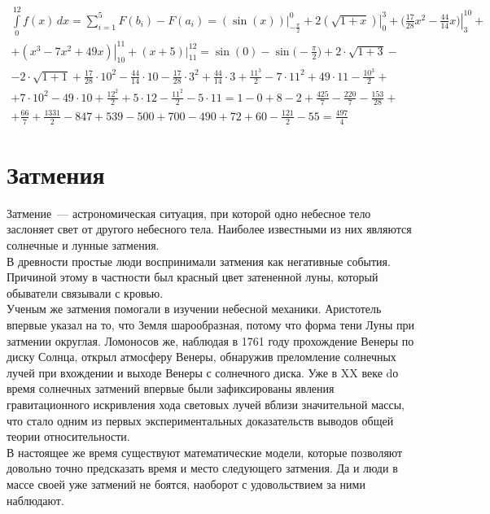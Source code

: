 \documentclass[30pt]{article}
\begin{document}
        \begin{multline}
            \int \limits_{0}^{12} f(x)\,dx = \sum \limits_{i = 1}^{5} F(b_i) - F(a_i) = \left. (\sin(x)) \right|_{-\frac{\pi}{2}}^{0} + 2 \left. (\sqrt{1 + x}) \right|_{0}^{3} + \bigg(\frac{17}{28}x^2 - \left. \frac{44}{14}x\bigg) \right|_{3}^{10} + \\
            + \left. (x^3 - 7x ^ 2 + 49x) \right|_{10}^{11} + \left. (x + 5) \right|_{11}^{12} =  \sin(0) - \sin\bigg(-\frac{\pi}{2}\bigg) + 2 \cdot \sqrt{1 + 3} - \\
            -2 \cdot \sqrt{1 + 1} + \frac{17}{28} \cdot 10^2 - \frac{44}{14} \cdot 10 - \frac{17}{28} \cdot 3^2 + \frac{44}{14} \cdot 3 + \frac{11^3}{2} - 7 \cdot 11^2 + 49 \cdot 11 - \frac{10^3}{2} + \\
            + 7 \cdot 10^2 - 49 \cdot 10 + \frac{12^2}{2} + 5 \cdot 12 - \frac{11^2}{2} - 5 \cdot 11 = 1 - 0 + 8 - 2 + \frac{425}{7} - \frac{220}{7} - \frac{153}{28} + \\
            + \frac{66}{7} + \frac{1331}{2} - 847 + 539 - 500 + 700 - 490 + 72 + 60 - \frac{121}{2} - 55 = \frac{497}{4}
            \label{eq:res}
        \end{multline}
    \section{Затмения}
        Затмение~--- астрономическая ситуация, при которой одно небесное тело заслоняет свет от другого небесного тела. Наиболее известными из них являются солнечные и лунные затмения. \\
        В древности простые люди воспринимали затмения как негативные события. Причиной этому в частности был красный цвет затененной луны, который обыватели связывали с кровью. \\
        Ученым же затмения помогали в изучении небесной механики. Аристотель впервые указал на то, что Земля шарообразная, потому что форма тени Луны при затмении округлая. Ломоносов же, наблюдая в 1761 году прохождение Венеры по диску Солнца, открыл атмосферу Венеры,  обнаружив преломление солнечных лучей при вхождении и выходе Венеры с солнечного диска. Уже в XX веке  dо время солнечных затмений впервые были зафиксированы явления гравитационного искривления хода световых лучей вблизи значительной массы, что стало одним из первых экспериментальных доказательств выводов общей теории относительности. \\
        В настоящее же время существуют математические модели, которые позволяют довольно точно предсказать время и место следующего затмения. Да и люди в массе своей уже затмений не боятся, наоборот с удовольствием за ними наблюдают. \\ 
        
\end{document}

